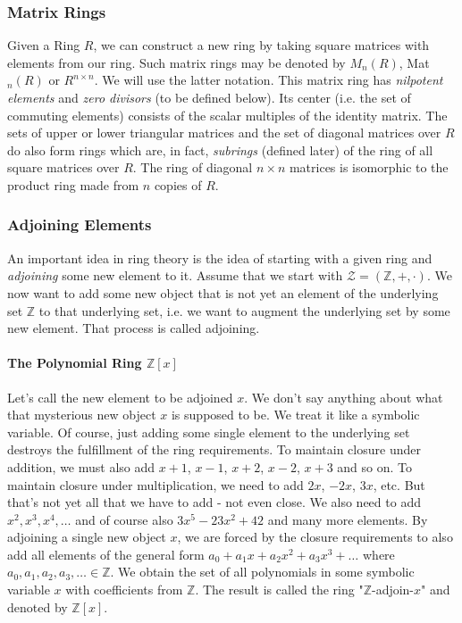 
\subsubsection{Matrix Rings}
Given a Ring $R$, we can construct a new ring by taking square matrices with elements from our ring. Such matrix rings may be denoted by $M_n(R)$, Mat$_n(R)$ or $R^{n \times n}$. We will use the latter notation. This matrix ring has \emph{nilpotent elements} and \emph{zero divisors} (to be defined below). Its center (i.e. the set of commuting elements) consists of the scalar multiples of the identity matrix. The sets of upper or lower triangular matrices and the set of diagonal matrices over $R$ do also form rings which are, in fact, \emph{subrings} (defined later) of the ring of all square matrices over $R$. The ring of diagonal $n \times n$ matrices is isomorphic to the product ring made from $n$ copies of $R$.


\subsubsection{Adjoining Elements}
An important idea in ring theory is the idea of starting with a given ring and \emph{adjoining} some new element to it. Assume that we start with $\mathcal{Z} = (\mathbb{Z},+,\cdot)$. We now want to add some new object that is not yet an element of the underlying set $\mathbb{Z}$ to that underlying set, i.e. we want to augment the underlying set by some new element. That process is called adjoining. 

\paragraph{The Polynomial Ring $\mathbb{Z}[x]$}
Let's call the new element to be adjoined $x$. We don't say anything about what that mysterious new object $x$ is supposed to be. We treat it like a symbolic variable. Of course, just adding some single element to the underlying set destroys the fulfillment of the ring requirements. To maintain closure under addition, we must also add $x+1$, $x-1$, $x+2$, $x-2$, $x+3$ and so on. To maintain closure under multiplication, we need to add $2 x$, $-2 x$, $3 x$, etc. But that's not yet all that we have to add - not even close. We also need to add $x^2, x^3, x^4, \ldots$ and of course also $3 x^5 - 23 x^2 + 42$ and many more elements. By adjoining a single new object $x$, we are forced by the closure requirements to also add all elements of the general form $a_0 + a_1 x + a_2 x^2 + a_3 x^3 + \ldots$ where $a_0, a_1, a_2, a_3, \ldots \in \mathbb{Z}$. We obtain the set of all polynomials in some symbolic variable $x$ with coefficients from $\mathbb{Z}$. The result is called the ring "$\mathbb{Z}$-adjoin-$x$" and denoted by $\mathbb{Z}[x]$.


